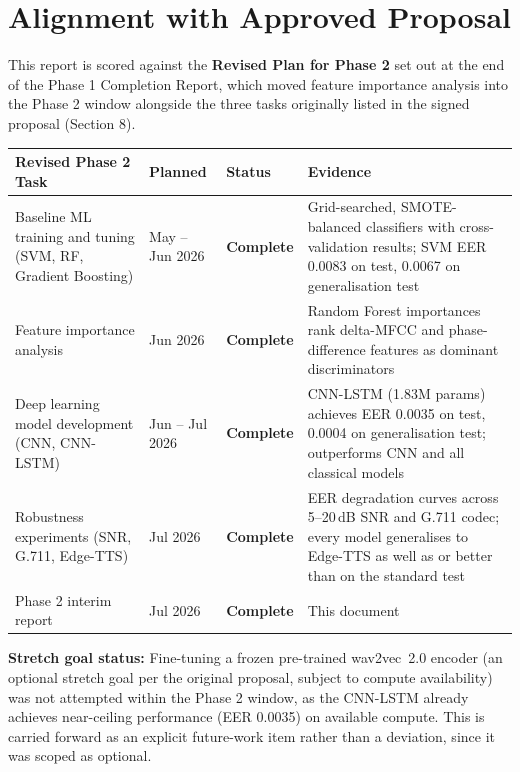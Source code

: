 \documentclass[12pt,a4paper]{report}
\newcommand{\statuscomplete}{\colorbox{statusgreen}{\color{white}\textbf{\small Complete}}}
\begin{document}
\chapter{Alignment with Approved Proposal}

This report is scored against the \textbf{Revised Plan for Phase 2} set out at the end of
the Phase 1 Completion Report, which moved feature importance analysis into the Phase 2
window alongside the three tasks originally listed in the signed proposal (Section 8).

\begin{center}
\begin{tabular}{L{3.5cm}C{2cm}C{1.8cm}L{5.7cm}}
  \toprule
  \color{white}\textbf{Revised Phase 2 Task} &
  \color{white}\textbf{Planned} &
  \color{white}\textbf{Status} &
  \color{white}\textbf{Evidence} \\
  \midrule
  Baseline ML training and tuning (SVM, RF, Gradient Boosting) &
  May -- Jun 2026 & \statuscomplete &
  Grid-searched, SMOTE-balanced classifiers with cross-validation results;
  SVM EER 0.0083 on test, 0.0067 on generalisation test \\[4pt]
  Feature importance analysis &
  Jun 2026 & \statuscomplete &
  Random Forest importances rank delta-MFCC and phase-difference features as
  dominant discriminators \\[4pt]
  Deep learning model development (CNN, CNN-LSTM) &
  Jun -- Jul 2026 & \statuscomplete &
  CNN-LSTM (1.83M params) achieves EER 0.0035 on test, 0.0004 on generalisation
  test; outperforms CNN and all classical models \\[4pt]
  Robustness experiments (SNR, G.711, Edge-TTS) &
  Jul 2026 & \statuscomplete &
  EER degradation curves across 5--20\,dB SNR and G.711 codec; every model
  generalises to Edge-TTS as well as or better than on the standard test \\[4pt]
  Phase 2 interim report &
  Jul 2026 & \statuscomplete &
  This document \\
  \bottomrule
\end{tabular}
\end{center}

\medskip
\begin{infobox}
  \textbf{Stretch goal status:} Fine-tuning a frozen pre-trained wav2vec~2.0 encoder
  (an optional stretch goal per the original proposal, subject to compute availability) was
  not attempted within the Phase 2 window, as the CNN-LSTM already achieves near-ceiling
  performance (EER 0.0035) on available compute. This is carried forward as an explicit
  future-work item rather than a deviation, since it was scoped as optional.
\end{infobox}
\end{document}
